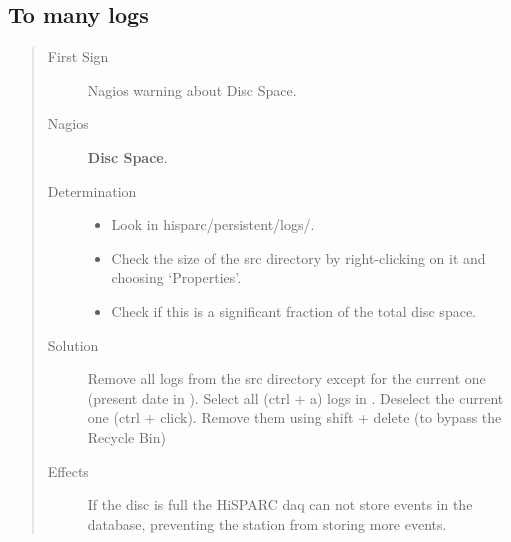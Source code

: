 \documentclass[a4paper,11pt,english]{sphinxmanual}
\begin{document}
\subsection{To many logs}
\label{known-issues:to-many-logs}\begin{quote}\begin{description}
\item[{First Sign}] \leavevmode
Nagios warning about Disc Space.

\item[{Nagios}] \leavevmode
\textbf{Disc Space}.

\item[{Determination}] \leavevmode\begin{itemize}
\item {} 
Look in hisparc/persistent/logs/.

\item {} 
Check the size of the src directory by right-clicking on it and choosing `Properties'.

\item {} 
Check if this is a significant fraction of the total disc space.

\end{itemize}

\item[{Solution}] \leavevmode
Remove all logs from the src directory except for the current one (present date in ). Select all (ctrl + a) logs in . Deselect the current one (ctrl + click). Remove them using shift + delete (to bypass the Recycle Bin)

\item[{Effects}] \leavevmode
If the disc is full the HiSPARC daq can not store events in the database, preventing the station from storing more events.

\end{description}\end{quote}
\end{document}
